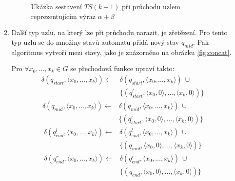 \documentclass[thesis=B,czech]{FITthesis}[2019/12/23]
\theoremstyle{definition}
\begin{document}
\begin{enumerate}
\begin{enumerate}
\begin{figure}[ht]
	\caption{Ukázka sestavení $TS(k+1)$ při průchodu uzlem reprezentujícím výraz $\alpha+\beta$}
	\label{fig:alter}
\end{figure}
	 \item \label{itm:concat}{Další typ uzlu, na který lze při průchodu narazit, je zřetězení. Pro tento typ uzlu se do množiny stavů automatu přidá nový stav $q_{mid}$. Pak algoritmus vytvoří  mezi stavy, jako je znázorněno na obrázku \ref{fig:concat}.
	
	Pro $\forall x_0, \dots, x_{k} \in G$ se přechodová funkce upraví takto:
		\begin{align*}\delta(q_{start}, \langle  x_0, \dots, x_{k}\rangle)\leftarrow&\delta(q_{start}, \langle  x_0, \dots, x_{k}\rangle) \ \cup \\&\{(q_{start}^{l}, \langle x_0, 0\rangle, \dots, \langle x_k, 0\rangle)\}\end{align*}
		\begin{align*}\delta(q_{mid}, \langle  x_0, \dots, x_{k}\rangle)\leftarrow&\delta(q_{mid}, \langle  x_0, \dots, x_{k}\rangle) \ \cup \\&\{(q_{start}^{r}, \langle x_0, 0\rangle, \dots, \langle x_k, 0\rangle)\}\end{align*}
		\begin{align*}\delta(q_{end}^{l}, \langle  x_0, \dots, x_{k}\rangle)\leftarrow&\delta(q_{end}^{l}, \langle  x_0, \dots, x_k\rangle) \ \cup\\&\{(q_{mid}, \langle x_0, 0\rangle, \dots, \langle x_k, 0\rangle)\}\end{align*}
		\begin{align*}\delta(q_{end}^{r}, \langle  x_0, \dots, x_{k}\rangle)\leftarrow&\delta(q_{end}^{r}, \langle  x_0, \dots, x_k\rangle) \ \cup\\&\{(q_{end}, \langle x_0, 0\rangle, \dots, \langle x_k, 0\rangle)\}\end{align*}
	}


\end{enumerate}
\end{enumerate}
\end{document}
